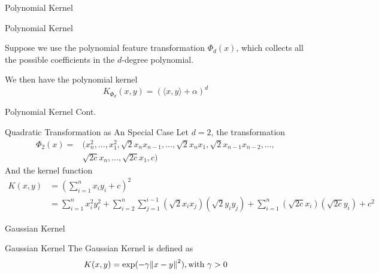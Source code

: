 \documentclass[10pt, compress]{beamer}
\begin{document}
\begin{frame}[fragile]{Polynomial Kernel}

  \begin{block}{Polynomial Kernel}

    Suppose we use the polynomial feature transformation \( \Phi_{d}(x) \), which collects all the possible coefficients in the \(d\)-degree polynomial.

    We then have the polynomial kernel
    \[
      K_{\Phi_{d}}(x, y) = {(\langle x,y \rangle + \alpha)}^{d}
    \]
  \end{block}

\end{frame}

\begin{frame}[fragile]{Polynomial Kernel Cont.}

  \begin{block}{Quadratic Transformation as An Special Case}
    Let \( d=2 \), the transformation
    \begin{align*}
      \Phi_{2}(x) =& (x_{n}^{2}, \dots, x_{1}^{2}, \sqrt{2}x_{n}x_{n-1}, \dots, \sqrt{2}x_{n}x_{1}, \sqrt{2}x_{n-1}x_{n-2}, \dots, \\
                  &\sqrt{2c}x_{n}, \dots, \sqrt{2c}x_{1}, c)
    \end{align*}
    And the kernel function
    \begin{align*}
    K(x, y) &= (\sum_{i=1}^{n} x_{i}y_{i} + c)^{2} \\
      &= \sum_{i=1}^{n}x_{i}^{2}y_{i}^{2} + \sum_{i=2}^{n}\sum_{j=1}^{i-1}(\sqrt{2}x_{i}x_{j})(\sqrt{2}y_{i}y_{j}) + \sum_{i=1}^{n}(\sqrt{2c}x_{i})(\sqrt{2c}y_{i}) + c^{2}
    \end{align*}
  \end{block}
\end{frame}


\begin{frame}[fragile]{Gaussian Kernel}

  \begin{block}{Gaussian Kernel}
    The Gaussian Kernel is defined as
    \[
      K(x, y) = \exp(-\gamma{\| x-y \|}^{2}), \text{with \( \gamma > 0\)}
    \]
  \end{block}

\end{frame}
\end{document}
